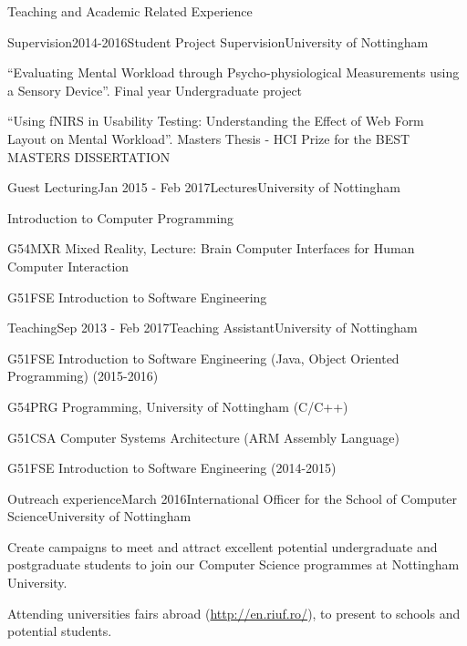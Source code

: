 \documentclass{resume} %
\begin{document}
\begin{rSection}{Teaching and Academic Related Experience}
	\begin{rSubsection}{Supervision}{2014-2016}{Student Project Supervision}{University of Nottingham}
        \item  ``Evaluating Mental Workload through Psycho-physiological Measurements using a Sensory Device''. Final year Undergraduate project
        \item  ``Using fNIRS in Usability Testing: Understanding the Effect of Web Form Layout on Mental Workload''. Masters Thesis - HCI Prize for the BEST MASTERS DISSERTATION
    \end{rSubsection}
    \vspace{-1 mm}
\vspace{-1 mm}
    \begin{rSubsection}{Guest Lecturing}{Jan 2015 - Feb 2017}{Lectures}{University of Nottingham}
    	\item Introduction to Computer Programming 
        \item G54MXR Mixed Reality, Lecture: Brain Computer Interfaces for Human Computer Interaction
        \item G51FSE Introduction to Software Engineering
    \end{rSubsection}
\vspace{-1 mm}
    \begin{rSubsection}{Teaching}{Sep 2013 - Feb 2017}{Teaching Assistant}{University of Nottingham}
        \item G51FSE Introduction to Software Engineering (Java, Object Oriented Programming) (2015-2016)
        \item G54PRG Programming, University of Nottingham (C/C++)
        \item G51CSA Computer Systems Architecture (ARM Assembly Language)
        \item G51FSE Introduction to Software Engineering (2014-2015)
    \end{rSubsection}
\vspace{-1 mm}
    \begin{rSubsection}{Outreach experience}{March 2016}{International Officer for the School of Computer Science}{University of Nottingham}
        \item Create campaigns to meet and attract excellent potential undergraduate and postgraduate students to join our Computer Science programmes at Nottingham University.
        \item Attending universities fairs abroad (\url{http://en.riuf.ro/}), to present to schools and potential students.

\end{rSubsection}
\end{rSection}
\end{document}
